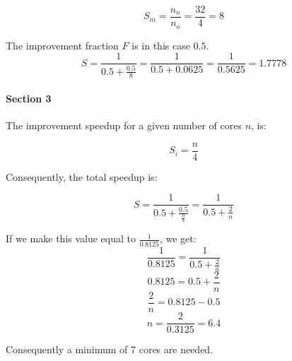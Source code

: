 \[
S_m = \frac{n_n}{n_o} = \frac{32}{4} = 8
\]

The improvement fraction $F$ is in this case $0.5$.
\[
S = \frac{1}{0.5 + \frac{0.5}{8}} = \frac{1}{0.5 + 0.0625} = \frac{1}{0.5625} = 1.7778
\]

\paragraph{Section 3}
The improvement speedup for a given number of cores $n$, is:

\[
S_i = \frac{n}{4}
\]

Consequently, the total speedup is:

\[
S = \frac{1}{0.5 + 
\frac{0.5}{\frac{n}{4}}} = 
\frac{1}{0.5 + \frac{2}{n}}
\]

If we make this value equal to $\frac{1}{0.8125}$, we get:
\[
\frac{1}{0.8125} = \frac{1}{0.5+\frac{2}{n}}
\]
\[ 0.8125 = 0.5 + \frac{2}{n} \]
\[ \frac{2}{n} = 0.8125 - 0.5 \]
\[ n = \frac{2}{0.3125} = 6.4 \]

Consequently a minimum of 7 cores are needed.
